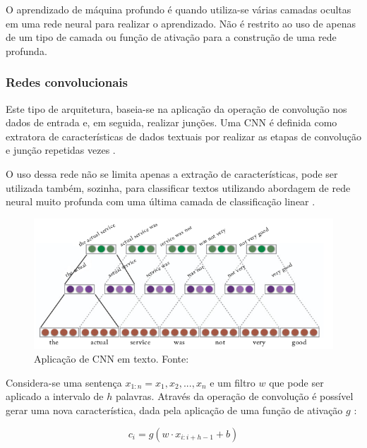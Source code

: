 O aprendizado de máquina profundo é quando utiliza-se várias camadas ocultas em uma rede neural para realizar o aprendizado. Não é restrito ao uso de apenas de um tipo de camada ou função de ativação para a construção de uma rede profunda.

\subsubsection{Redes convolucionais}

Este tipo de arquitetura, baseia-se na aplicação da operação de convolução nos dados de entrada e, em seguida, realizar junções. Uma CNN é definida como extratora de características de dados textuais por realizar as etapas de convolução e junção repetidas vezes \cite{goldberg_neural_2017}. 

O uso dessa rede não se limita apenas a extração de características, pode ser utilizada também, sozinha, para classificar textos utilizando abordagem de rede neural muito profunda com uma última camada de classificação linear \cite{conneau_very_2017}.

\begin{figure}[ht]
	\centering
	\includegraphics[keepaspectratio=true,scale=0.5]{figuras/cnnText}
	\caption[Aplicação de CNN em texto]{Aplicação de CNN em texto. Fonte: }
	\label{fig:filterCnnText}
\end{figure}

Considera-se uma sentença $x_{1:n} = x_{1}, x_{2}, ..., x_{n}$ e um filtro $w$ que pode ser aplicado a intervalo de $h$ palavras. Através da operação de convolução é possível gerar uma nova característica, dada pela aplicação de uma função de ativação $g$ \cite{kim_convolutional_2014}:

\begin{equation}
	\label{eq:convolutionText}
	c_{i} = g(w \cdot x_{i:i+h-1} + b)
\end{equation}

